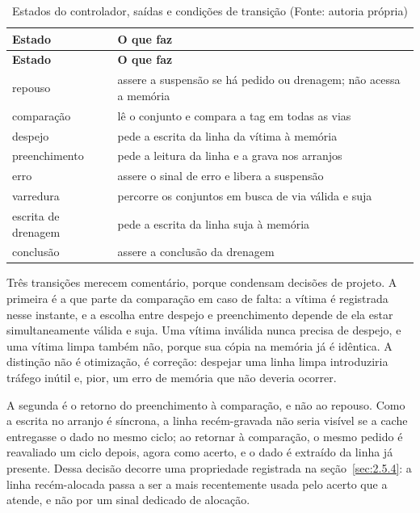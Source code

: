 {\small
\begin{longtable}{@{}>{\raggedright\arraybackslash}p{}>{\raggedright\arraybackslash}p{}@{}}
\caption[Estados do controlador, saídas e condições de transição]{Estados do controlador, saídas e condições de transição (Fonte: autoria própria)}\label{tab:4.7}\\
\hline
\textbf{Estado} & \textbf{O que faz} \\
\hline
\endfirsthead
\hline
\textbf{Estado} & \textbf{O que faz} \\
\hline
\endhead
\hline
\endlastfoot
repouso & assere a suspensão se há pedido ou drenagem; não acessa a memória \\
comparação & lê o conjunto e compara a tag em todas as vias \\
despejo & pede a escrita da linha da vítima à memória \\
preenchimento & pede a leitura da linha e a grava nos arranjos \\
erro & assere o sinal de erro e libera a suspensão \\
varredura & percorre os conjuntos em busca de via válida e suja \\
escrita de drenagem & pede a escrita da linha suja à memória \\
conclusão & assere a conclusão da drenagem \\
\end{longtable}
}

Três transições merecem comentário, porque condensam decisões de projeto. A primeira é a que parte da comparação em caso de falta: a vítima é registrada nesse instante, e a escolha entre despejo e preenchimento depende de ela estar simultaneamente válida e suja. Uma vítima inválida nunca precisa de despejo, e uma vítima limpa também não, porque sua cópia na memória já é idêntica. A distinção não é otimização, é correção: despejar uma linha limpa introduziria tráfego inútil e, pior, um erro de memória que não deveria ocorrer.

A segunda é o retorno do preenchimento à comparação, e não ao repouso. Como a escrita no arranjo é síncrona, a linha recém-gravada não seria visível se a cache entregasse o dado no mesmo ciclo; ao retornar à comparação, o mesmo pedido é reavaliado um ciclo depois, agora como acerto, e o dado é extraído da linha já presente. Dessa decisão decorre uma propriedade registrada na seção~\ref{sec:2.5.4}: a linha recém-alocada passa a ser a mais recentemente usada pelo acerto que a atende, e não por um sinal dedicado de alocação.


